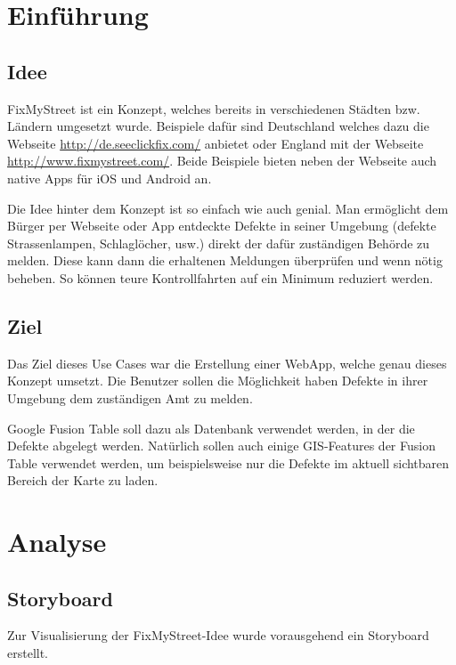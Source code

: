 \section{Einführung}
\subsection{Idee}
FixMyStreet ist ein Konzept, welches bereits in verschiedenen Städten bzw. Ländern umgesetzt wurde. Beispiele dafür sind Deutschland welches dazu die Webseite  \url{http://de.seeclickfix.com/} anbietet oder England mit der Webseite \url{http://www.fixmystreet.com/}. Beide Beispiele bieten neben der Webseite auch native Apps für iOS und Android an.

Die Idee hinter dem Konzept ist so einfach wie auch genial. Man ermöglicht dem Bürger per Webseite oder App entdeckte Defekte in seiner Umgebung (defekte Strassenlampen, Schlaglöcher, usw.) direkt der dafür zuständigen Behörde zu melden. Diese kann dann die erhaltenen Meldungen überprüfen und wenn nötig beheben. So können teure Kontrollfahrten auf ein Minimum reduziert werden.

\subsection{Ziel}
Das Ziel dieses Use Cases war die Erstellung einer WebApp, welche genau dieses Konzept umsetzt. Die Benutzer sollen die Möglichkeit haben Defekte in ihrer Umgebung dem zuständigen Amt zu melden.

Google Fusion Table soll dazu als Datenbank verwendet werden, in der die Defekte abgelegt werden. Natürlich sollen auch einige GIS-Features der Fusion Table verwendet werden, um beispielsweise nur die Defekte im aktuell sichtbaren Bereich der Karte zu laden.

\section{Analyse}

\subsection{Storyboard}
Zur Visualisierung der FixMyStreet-Idee wurde vorausgehend ein Storyboard erstellt.

